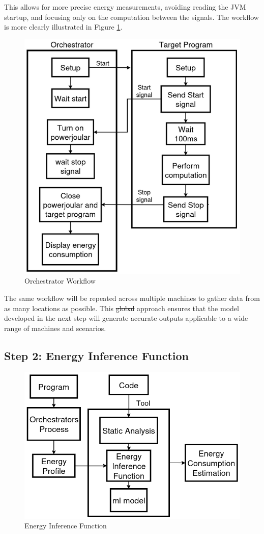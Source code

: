 \documentclass[sigplan]{acmart}
\begin{document}
This allows for more precise energy measurements, avoiding reading the JVM startup, and focusing only on the computation between the signals. The workflow is more clearly illustrated in Figure \ref{fig:orchestrators_process}.

\begin{figure}%
  \centering
  \includegraphics[width = 0.4 \textwidth]{figures/orchestrators_process.png}
  \caption{Orchestrator Workflow}
  \label{fig:orchestrators_process}
\end{figure}

The same workflow will be repeated across multiple machines to gather data from as many locations as possible. This \st{global} approach ensures that the model developed in the next step will generate accurate outputs applicable to a wide range of machines and scenarios.

\subsection{Step 2: Energy Inference Function} \label{sec:work_step2_energy_inference_function}

\begin{figure}%
  \centering
  \includegraphics[width = 0.4 \textwidth]{figures/energy_inf_fun.png}
  \caption{Energy Inference Function}
  \label{fig:energy_inference_function}
\end{figure}
\end{document}
